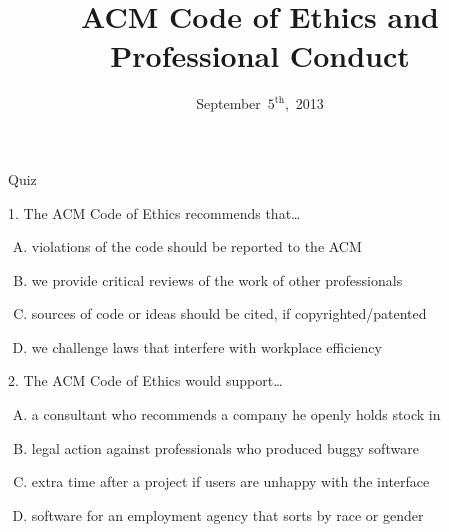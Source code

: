 \documentclass{beamer}
\title[ACM Code]{ACM Code of Ethics and Professional Conduct}
\date{September~$5^{\text{th}}$,~2013}
\begin{document}
\begin{frame}
\titlepage
\end{frame}

\begin{frame}{Quiz}
\begin{block}{1. The ACM Code of Ethics recommends that\ldots}
\begin{enumerate}[(A)]
\item<1> violations of the code should be reported to the ACM
\item<1-3> we provide critical reviews of the work of other professionals
\item<1> sources of code or ideas should be cited, if copyrighted/patented
\item<1> we challenge laws that interfere with workplace efficiency
\end{enumerate}
\end{block}
\begin{block}{2. The ACM Code of Ethics would support\ldots}
\begin{enumerate}[(A)]
\item<1-3> a consultant who recommends a company he openly holds stock in
\item<1-2> legal action against professionals who produced buggy software
\item<1-2> extra time after a project if users are unhappy with the interface
\item<1-2> software for an employment agency that sorts by race or gender
\end{enumerate}
\end{block}
\end{frame}
\end{document}
